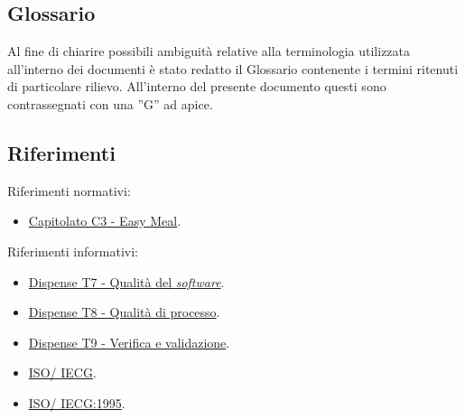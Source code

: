 \subsection{Glossario}
Al fine di chiarire possibili ambiguità relative alla terminologia utilizzata all'interno dei documenti è stato redatto il Glossario contenente i termini ritenuti di particolare rilievo.
All'interno del presente documento questi sono contrassegnati con una ”G” ad apice.

\subsection{Riferimenti}
Riferimenti normativi:
\begin{itemize}
	\item \href{https://www.math.unipd.it/~tullio/IS-1/2023/Progetto/C3.pdf}{Capitolato C3 - Easy Meal}.
\end{itemize}

\noindent
Riferimenti informativi:
\begin{itemize}
	\item \href{https://www.math.unipd.it/~tullio/IS-1/2023/Dispense/T7.pdf}{Dispense T7 - Qualità del \textit{software}}.
	\item \href{https://www.math.unipd.it/~tullio/IS-1/2023/Dispense/T8.pdf}{Dispense T8 - Qualità di processo}.
	\item \href{https://www.math.unipd.it/~tullio/IS-1/2023/Dispense/T9.pdf}{Dispense T9 - Verifica e validazione}.
	\item \href{https://it.wikipedia.org/wiki/ISO/IEC_9126}{ISO\g/ IECG}.
	\item \href{https://www.math.unipd.it/~tullio/IS-1/2009/Approfondimenti/ISO_12207-1995.pdf}{ISO\g/ IECG:1995}.
\end{itemize}
